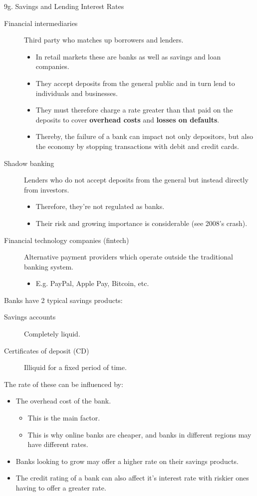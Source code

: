 \begin{CHPT_SUMM_AUTO}[label = {L.-9g}]{9g. Savings and Lending Interest Rates}
\begin{description}
	\item[Financial intermediaries]	Third party who matches up borrowers and lenders.
		\begin{itemize}[leftmargin = *]
		\item	In retail markets these are banks as well as savings and loan companies.
		\item	They accept deposits from the general public and in turn lend to individuals and businesses.
		\item	They must therefore charge a rate greater than that paid on the deposits to cover \textbf{overhead costs} and \textbf{losses on defaults}.
		\item	Thereby, the failure of a bank can impact not only depositors, but also the economy by stopping transactions with debit and credit cards.
		\end{itemize}
	\item[Shadow banking]	Lenders who do not accept deposits from the general but instead directly from investors.
		\begin{itemize}[leftmargin = *]
		\item	Therefore, they're not regulated as banks.
		\item	Their risk and growing importance is considerable (see 2008's crash).
		\end{itemize}
	\item[Financial technology companies (fintech)]	Alternative payment providers which operate outside the traditional banking system.
		\begin{itemize}[leftmargin = *]
		\item	E.g. PayPal, Apple Pay, Bitcoin, etc.
		\end{itemize}
\end{description}

\tcbline

Banks have 2 typical savings products:
\begin{description}
	\item[Savings accounts]	Completely liquid.
	\item[Certificates of deposit (CD)]	Illiquid for a fixed period of time.
\end{description}
The rate of these can be influenced by:
\begin{itemize}[leftmargin = *]
	\item	The overhead cost of the bank.
		\begin{itemize}[leftmargin = *]
		\item	This is the main factor.
		\item	This is why online banks are cheaper, and banks in different regions may have different rates.
		\end{itemize}
	\item	Banks looking to grow may offer a higher rate on their savings products.
	\item	The credit rating of a bank can also affect it's interest rate with riskier ones having to offer a greater rate.
\end{itemize}


\end{CHPT_SUMM_AUTO}
